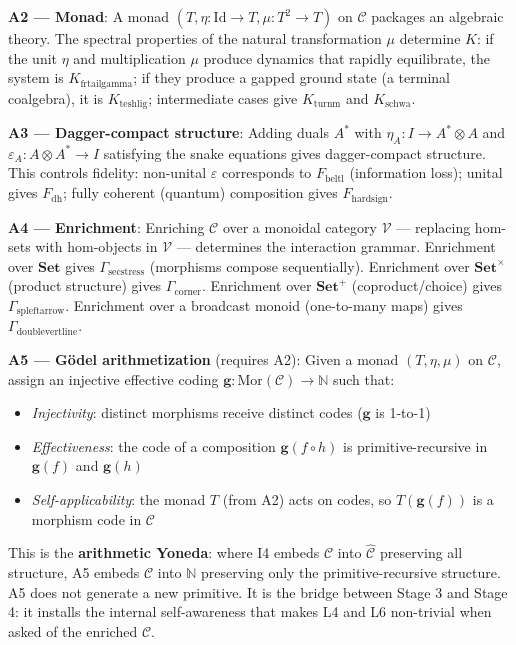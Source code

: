 \documentclass[12pt,a4paper]{article}
\begin{document}
\textbf{A2 --- Monad}: A monad $(T, \eta: \text{Id} \to T, \mu: T^2 \to T)$ on $\mathcal{C}$ packages an algebraic theory. The spectral properties of the natural transformation $\mu$ determine $K$: if the unit $\eta$ and multiplication $\mu$ produce dynamics that rapidly equilibrate, the system is $K_{\text{frtailgamma}}$; if they produce a gapped ground state (a terminal coalgebra), it is $K_{\text{teshlig}}$; intermediate cases give $K_{\text{turnm}}$ and $K_{\text{schwa}}$.

\textbf{A3 --- Dagger-compact structure}: Adding duals $A^*$ with $\eta_A: I \to A^* \otimes A$ and $\varepsilon_A: A \otimes A^* \to I$ satisfying the snake equations gives dagger-compact structure. This controls fidelity: non-unital $\varepsilon$ corresponds to $F_{\text{beltl}}$ (information loss); unital gives $F_{\text{dh}}$; fully coherent (quantum) composition gives $F_{\text{hardsign}}$.

\textbf{A4 --- Enrichment}: Enriching $\mathcal{C}$ over a monoidal category $\mathcal{V}$ --- replacing hom-sets with hom-objects in $\mathcal{V}$ --- determines the interaction grammar. Enrichment over $\mathbf{Set}$ gives $\Gamma_{\text{secstress}}$ (morphisms compose sequentially). Enrichment over $\mathbf{Set}^\times$ (product structure) gives $\Gamma_{\text{corner}}$. Enrichment over $\mathbf{Set}^+$ (coproduct/choice) gives $\Gamma_{\text{spleftarrow}}$. Enrichment over a broadcast monoid (one-to-many maps) gives $\Gamma_{\text{doublevertline}}$.

\textbf{A5 --- G\"odel arithmetization} (requires A2): Given a monad $(T, \eta, \mu)$ on $\mathcal{C}$, assign an injective effective coding $\mathbf{g}: \text{Mor}(\mathcal{C}) \to \mathbb{N}$ such that:
\begin{itemize}
\item \emph{Injectivity}: distinct morphisms receive distinct codes ($\mathbf{g}$ is 1-to-1)
\item \emph{Effectiveness}: the code of a composition $\mathbf{g}(f \circ h)$ is primitive-recursive in $\mathbf{g}(f)$ and $\mathbf{g}(h)$
\item \emph{Self-applicability}: the monad $T$ (from A2) acts on codes, so $T(\mathbf{g}(f))$ is a morphism code in $\mathcal{C}$
\end{itemize}
This is the \textbf{arithmetic Yoneda}: where I4 embeds $\mathcal{C}$ into $\hat{\mathcal{C}}$ preserving all structure, A5 embeds $\mathcal{C}$ into $\mathbb{N}$ preserving only the primitive-recursive structure. A5 does not generate a new primitive. It is the bridge between Stage 3 and Stage 4: it installs the internal self-awareness that makes L4 and L6 non-trivial when asked of the enriched $\mathcal{C}$.
\end{document}
